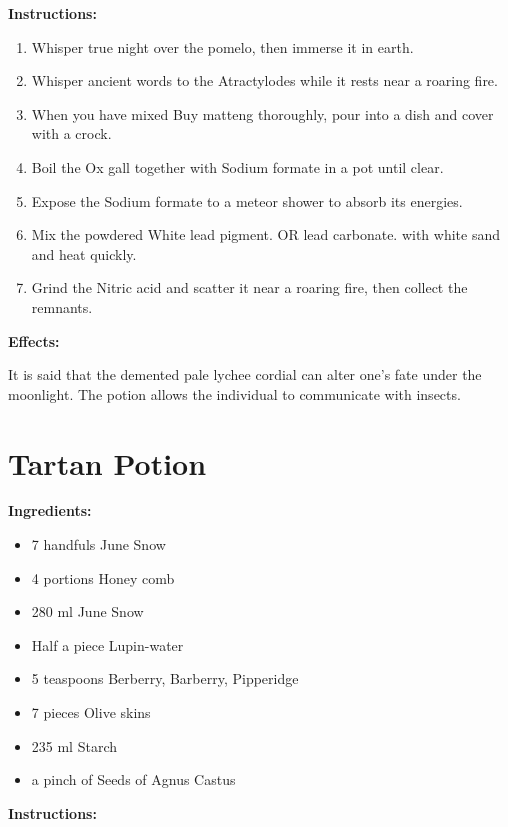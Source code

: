 \documentclass{article}
\begin{document}
\textbf{Instructions:}

\begin{enumerate}
  \item Whisper true night over the pomelo, then immerse it in earth.
  \item Whisper ancient words to the Atractylodes while it rests near a roaring fire.
  \item When you have mixed Buy matteng thoroughly, pour into a dish and cover with a crock.
  \item Boil the Ox gall together with Sodium formate in a pot until clear.
  \item Expose the Sodium formate to a meteor shower to absorb its energies.
  \item Mix the powdered White lead pigment. OR lead carbonate. with white sand and heat quickly.
  \item Grind the Nitric acid and scatter it near a roaring fire, then collect the remnants.
\end{enumerate}

\textbf{Effects:}

It is said that the demented pale lychee cordial can alter one's fate under the moonlight. The potion allows the individual to communicate with insects.

\newpage
\section*{Tartan Potion}

\textbf{Ingredients:}

\begin{itemize}
  \item 7 handfuls June Snow
  \item 4 portions Honey comb
  \item 280 ml June Snow
  \item Half a piece Lupin-water
  \item 5 teaspoons Berberry, Barberry, Pipperidge
  \item 7 pieces Olive skins
  \item 235 ml Starch
  \item a pinch of Seeds of Agnus Castus
\end{itemize}

\textbf{Instructions:}
\end{document}
